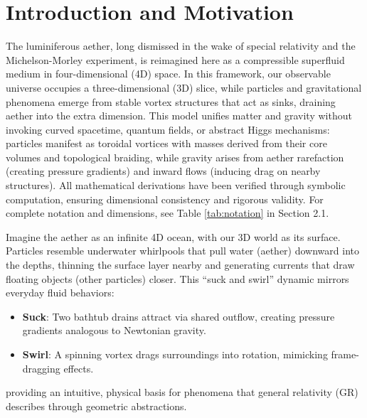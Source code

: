\documentclass{article}
\begin{document}
\section{Introduction and Motivation}

The luminiferous aether, long dismissed in the wake of special relativity and the Michelson-Morley experiment, is reimagined here as a compressible superfluid medium in four-dimensional (4D) space. In this framework, our observable universe occupies a three-dimensional (3D) slice, while particles and gravitational phenomena emerge from stable vortex structures that act as sinks, draining aether into the extra dimension. This model unifies matter and gravity without invoking curved spacetime, quantum fields, or abstract Higgs mechanisms: particles manifest as toroidal vortices with masses derived from their core volumes and topological braiding, while gravity arises from aether rarefaction (creating pressure gradients) and inward flows (inducing drag on nearby structures). All mathematical derivations have been verified through symbolic computation, ensuring dimensional consistency and rigorous validity. For complete notation and dimensions, see Table \ref{tab:notation} in Section 2.1.

Imagine the aether as an infinite 4D ocean, with our 3D world as its surface. Particles resemble underwater whirlpools that pull water (aether) downward into the depths, thinning the surface layer nearby and generating currents that draw floating objects (other particles) closer. This ``suck and swirl'' dynamic mirrors everyday fluid behaviors:
\begin{itemize}
    \item \textbf{Suck}: Two bathtub drains attract via shared outflow, creating pressure gradients analogous to Newtonian gravity.
    \item \textbf{Swirl}: A spinning vortex drags surroundings into rotation, mimicking frame-dragging effects.
\end{itemize}
providing an intuitive, physical basis for phenomena that general relativity (GR) describes through geometric abstractions.

\medskip
\noindent
{}
\medskip
\end{document}
